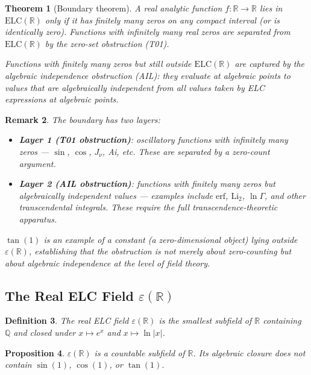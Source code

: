 \documentclass[11pt]{article}
\newtheorem{theorem}{Theorem}
\newtheorem{proposition}[theorem]{Proposition}
\newtheorem{definition}[theorem]{Definition}
\newtheorem{remark}[theorem]{Remark}
\begin{document}
\begin{theorem}[Boundary theorem]
\label{thm:boundary}
A real analytic function $f:\mathbb{R}\to\mathbb{R}$ lies in $\mathrm{ELC}(\mathbb{R})$
only if it has \emph{finitely many zeros} on any compact interval (or is identically zero).
Functions with infinitely many real zeros are separated from $\mathrm{ELC}(\mathbb{R})$
by the zero-set obstruction (T01).

Functions with finitely many zeros but still outside $\mathrm{ELC}(\mathbb{R})$ are captured
by the algebraic independence obstruction (AIL): they evaluate at algebraic points to values
that are algebraically independent from all values taken by ELC expressions at algebraic points.
\end{theorem}

\begin{remark}
The boundary has two layers:
\begin{itemize}
  \item \textbf{Layer 1 (T01 obstruction)}: oscillatory functions with infinitely many zeros ---
    $\sin$, $\cos$, $J_\nu$, Ai, etc. These are separated by a zero-count argument.
  \item \textbf{Layer 2 (AIL obstruction)}: functions with finitely many zeros but algebraically
    independent values --- examples include $\mathrm{erf}$, $\mathrm{Li}_2$, $\ln\Gamma$,
    and other transcendental integrals. These require the full transcendence-theoretic apparatus.
\end{itemize}
$\tan(1)$ is an example of a \emph{constant} (a zero-dimensional object) lying outside
$\varepsilon(\mathbb{R})$, establishing that the obstruction is not merely about zero-counting
but about algebraic independence at the level of field theory.
\end{remark}

\subsection{The Real ELC Field $\varepsilon(\mathbb{R})$}

\begin{definition}
The \emph{real ELC field} $\varepsilon(\mathbb{R})$ is the smallest subfield of $\mathbb{R}$
containing $\mathbb{Q}$ and closed under $x\mapsto e^x$ and $x\mapsto\ln|x|$.
\end{definition}

\begin{proposition}
$\varepsilon(\mathbb{R})$ is a countable subfield of $\mathbb{R}$. Its algebraic closure
does not contain $\sin(1)$, $\cos(1)$, or $\tan(1)$.
\end{proposition}
\end{document}
